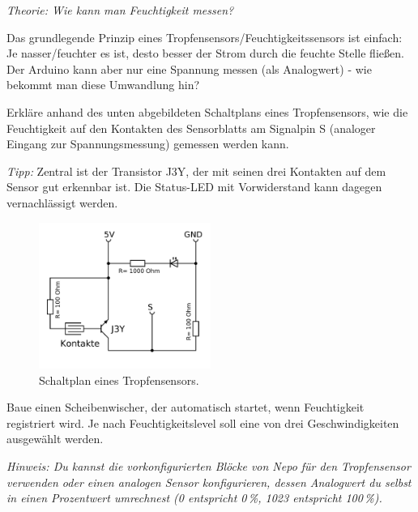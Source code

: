 \begin{aufgabe} \emph{Theorie: Wie kann man Feuchtigkeit messen?}
	
	Das grundlegende Prinzip eines Tropfensensors/Feuchtigkeitssensors ist einfach: Je nasser/feuchter es ist, desto besser der Strom durch die feuchte Stelle fließen. Der Arduino kann aber nur eine Spannung messen (als Analogwert) - wie bekommt man diese Umwandlung hin?
	
	Erkläre anhand des unten abgebildeten Schaltplans eines Tropfensensors, wie die Feuchtigkeit auf den Kontakten des Sensorblatts am Signalpin S (analoger Eingang zur Spannungsmessung) gemessen werden kann.
	
	\emph{Tipp:} Zentral ist der Transistor J3Y, der mit seinen drei Kontakten auf dem Sensor gut erkennbar ist. Die Status-LED mit Vorwiderstand kann dagegen vernachlässigt werden.
\end{aufgabe}
\begin{figure}[H]
	\centering
	\includegraphics[width=0.5\textwidth]{./Zeichnungen/tropfensensor-ersatz.png}
	\caption{Schaltplan eines Tropfensensors.}
\end{figure}

\begin{projekt}\label{proj:auto-scheibenwischer}
	Baue einen Scheibenwischer, der automatisch startet, wenn Feuchtigkeit registriert wird. Je nach Feuchtigkeitslevel soll eine von drei Geschwindigkeiten ausgewählt werden.
	
	\emph{Hinweis: Du kannst die vorkonfigurierten Blöcke von Nepo für den Tropfensensor verwenden oder einen analogen Sensor konfigurieren, dessen Analogwert du selbst in einen Prozentwert umrechnest (0 entspricht 0\,\%, 1023 entspricht 100\,\%).}
\end{projekt}

